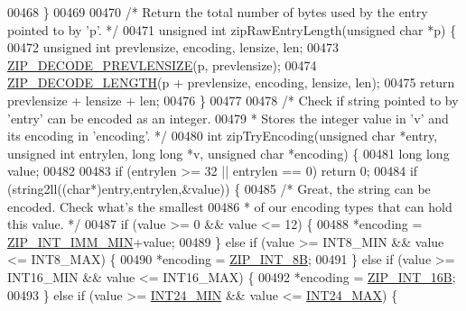 \begin{DoxyCode}
{{00468 \}
00469 
00470 \textcolor{comment}{/* Return the total number of bytes used by the entry pointed to by 'p'. */}
00471 \textcolor{keywordtype}{unsigned} \textcolor{keywordtype}{int} zipRawEntryLength(\textcolor{keywordtype}{unsigned} \textcolor{keywordtype}{char} *p) \{
00472     \textcolor{keywordtype}{unsigned} \textcolor{keywordtype}{int} prevlensize, encoding, lensize, len;
00473     \hyperlink{ziplist_8c_a0bae94c4c67cbd6a27ea3e2f17fb0210}{ZIP\_DECODE\_PREVLENSIZE}(p, prevlensize);
00474     \hyperlink{ziplist_8c_acdddca374b430c930d4b2d08f5de7a62}{ZIP\_DECODE\_LENGTH}(p + prevlensize, encoding, lensize, len);
00475     \textcolor{keywordflow}{return} prevlensize + lensize + len;
00476 \}
00477 
00478 \textcolor{comment}{/* Check if string pointed to by 'entry' can be encoded as an integer.}
00479 \textcolor{comment}{ * Stores the integer value in 'v' and its encoding in 'encoding'. */}
00480 \textcolor{keywordtype}{int} zipTryEncoding(\textcolor{keywordtype}{unsigned} \textcolor{keywordtype}{char} *entry, \textcolor{keywordtype}{unsigned} \textcolor{keywordtype}{int} entrylen, \textcolor{keywordtype}{long} \textcolor{keywordtype}{long} *v, \textcolor{keywordtype}{unsigned} \textcolor{keywordtype}{char} *encoding)
       \{
00481     \textcolor{keywordtype}{long} \textcolor{keywordtype}{long} value;
00482 
00483     \textcolor{keywordflow}{if} (entrylen >= 32 || entrylen == 0) \textcolor{keywordflow}{return} 0;
00484     \textcolor{keywordflow}{if} (string2ll((\textcolor{keywordtype}{char}*)entry,entrylen,&value)) \{
00485         \textcolor{comment}{/* Great, the string can be encoded. Check what's the smallest}
00486 \textcolor{comment}{         * of our encoding types that can hold this value. */}
00487         \textcolor{keywordflow}{if} (value >= 0 && value <= 12) \{
00488             *encoding = \hyperlink{ziplist_8c_af5120069edca0811f31d130674a0de47}{ZIP\_INT\_IMM\_MIN}+value;
00489         \} \textcolor{keywordflow}{else} \textcolor{keywordflow}{if} (value >= INT8\_MIN && value <= INT8\_MAX) \{
00490             *encoding = \hyperlink{ziplist_8c_a0c6338e8866d85135cfc7c340b2c213c}{ZIP\_INT\_8B};
00491         \} \textcolor{keywordflow}{else} \textcolor{keywordflow}{if} (value >= INT16\_MIN && value <= INT16\_MAX) \{
00492             *encoding = \hyperlink{ziplist_8c_a57e9bc0aacf9f30d8b76566e40c31a6b}{ZIP\_INT\_16B};
00493         \} \textcolor{keywordflow}{else} \textcolor{keywordflow}{if} (value >= \hyperlink{ziplist_8c_a6e56f9eebea6721ecf9e59d3a5190617}{INT24\_MIN} && value <= \hyperlink{ziplist_8c_a4ade7f65b05984f1f21a8223e70c9fac}{INT24\_MAX}) \{
}}
\end{DoxyCode}
